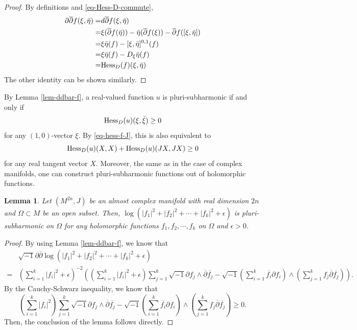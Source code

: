 \documentclass[12pt]{amsart}
\def\ol{\overline}
\def\e{\epsilon}
\def\p{\partial}
\def\ol{\overline}
\def\ii{{\sqrt{-1}}}
\def\dbar{\overline{\partial }}
\def\ddbar{\partial\overline\partial}
\def\iddbar{{\sqrt{-1}\partial \overline\partial}}
\newtheorem{lem}{Lemma}[section]
\theoremstyle{definition}
\theoremstyle{remark}
\numberwithin{equation}{section}
\def\Hess{{\rm Hess}}
\begin{document}
\begin{proof}
By definitions and \eqref{eq-Hess-D-commute},
\begin{equation}
\begin{split}
\ddbar f(\xi,\bar \eta)=&d\dbar f(\xi,\bar\eta)\\
=&\xi(\dbar f(\bar \eta))-\bar\eta(\dbar f(\xi))-\dbar f([\xi,\bar\eta])\\
=&\xi\bar\eta(f)-[\xi,\bar\eta]^{0,1}(f)\\
=&\xi\bar\eta(f)-D_\xi\bar\eta(f)\\
=&\Hess_D(f)(\xi,\bar\eta)
\end{split}
\end{equation}
The other identity can be shown similarly.
\end{proof}
By Lemma \ref{lem-ddbar-f}, a real-valued function $u$ is pluri-subharmonic if and only if
\begin{equation}
\Hess_D(u)(\xi,\bar\xi)\geq0
\end{equation}
for any $(1,0)$-vector $\xi$. By \eqref{eq-hess-f-J}, this is also equivalent to
\begin{equation}
\Hess_D(u)(X,X)+\Hess_D(u)(JX,JX)\geq 0
\end{equation}
for any real tangent vector $X$. Moreover, the same as in the case of complex manifolds, one can construct pluri-subharmonic functions out of holomorphic functions.
\begin{lem}\label{lem-holo-psh}
Let $(M^{2n}, J)$ be an almost complex manifold with real dimension $2n$ and $\Omega\subset M$ be an open subset.
Then,  $\log(|f_1|^2+|f_2|^2+\cdots+|f_k|^2+\e)$ is pluri-subharmonic on $\Omega$ for any holomorphic functions $f_1,f_2,\cdots, f_k$ on $\Omega$ and $\e>0$.
\end{lem}
\begin{proof}
By using Lemma \ref{lem-ddbar-f}, we know that
\begin{equation}
\begin{split}
&\iddbar \log(|f_1|^2+|f_2|^2+\cdots+|f_k|^2+\e)\\
=&\left(\sum_{i=1}^k|f_i|^2+\e\right)^{-2}\left(\left(\sum_{i=1}^k|f_i|^2+\e\right)\sum_{j=1}^k\ii\p f_j\wedge\dbar \ol{f_j}-\ii\left(\sum_{i=1}^k\ol{f_i}\p f_i\right)\wedge\left(\sum_{j=1}^kf_j\dbar\ol{f_j}\right)\right).
\end{split}
\end{equation}
By the Cauchy-Schwarz inequality, we know that
\begin{equation}
\left(\sum_{i=1}^k|f_i|^2\right)\sum_{j=1}^k\ii\p f_j\wedge\dbar \ol{f_j}-\ii\left(\sum_{i=1}^k\ol{f_i}\p f_i\right)\wedge\left(\sum_{j=1}^kf_j\dbar\ol{f_j}\right)\geq 0.
\end{equation}
Then, the conclusion of the lemma follows directly.
\end{proof}
\end{document}
